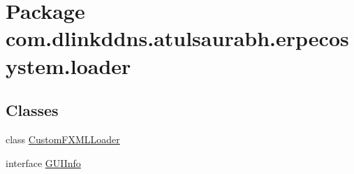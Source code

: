 \hypertarget{namespacecom_1_1dlinkddns_1_1atulsaurabh_1_1erpecosystem_1_1loader}{}\section{Package com.\+dlinkddns.\+atulsaurabh.\+erpecosystem.\+loader}
\label{namespacecom_1_1dlinkddns_1_1atulsaurabh_1_1erpecosystem_1_1loader}
\subsection*{Classes}
\begin{DoxyCompactItemize}
\item 
class \mbox{\hyperlink{classcom_1_1dlinkddns_1_1atulsaurabh_1_1erpecosystem_1_1loader_1_1_custom_f_x_m_l_loader}{Custom\+F\+X\+M\+L\+Loader}}
\item 
interface \mbox{\hyperlink{interfacecom_1_1dlinkddns_1_1atulsaurabh_1_1erpecosystem_1_1loader_1_1_g_u_i_info}{G\+U\+I\+Info}}
\end{DoxyCompactItemize}
